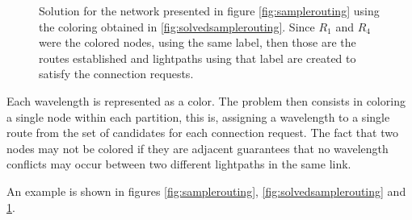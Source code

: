 \begin{figure}[h]
	\centering
		
		\caption{Solution for the network presented in figure \ref{fig:samplerouting} using the coloring obtained in \ref{fig:solvedsamplerouting}. Since $R_1$ and $R_4$ were the colored nodes, using the same label, then those are the routes established and lightpaths using that label are created to satisfy the connection requests.}
		\label{fig:solvedsampleroutingnetwork}
	\end{figure}

Each wavelength is represented as a color. The problem then consists in coloring a single node within each partition, this is, assigning a wavelength to a single route from the set of candidates for each connection request. The fact that two nodes may not be colored if they are adjacent guarantees  that no wavelength conflicts may occur between two different lightpaths in the same link.

An example is shown in figures \ref{fig:samplerouting}, \ref{fig:solvedsamplerouting} and \ref{fig:solvedsampleroutingnetwork}.

